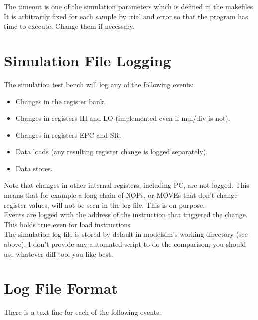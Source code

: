     The timeout is one of the simulation parameters which is defined in
    the makefiles. It is arbitrarily fixed for each sample by trial and error 
    so that the program has time to execute. Change them if necessary.\\
    
\section{Simulation File Logging}
\label{sim_logging}

    The simulation test bench will log any of the following events:

    \begin{itemize}
    \item Changes in the register bank.
    \item Changes in registers HI and LO (implemented even if mul/div is not).
    \item Changes in registers EPC and SR.
    \item Data loads (any resulting register change is logged separately).
    \item Data stores.
    \end{itemize}

    Note that changes in other internal registers, including PC, are not logged.
    This means that for example a long chain of NOPs, or MOVEs that don't change
    register values, will not be seen in the log file. This is on purpose.\\

    Events are logged with the address of the instruction that triggered 
    the change. This holds true even for load instructions.\\

    The simulation log file is stored by default in modelsim's working directory
    (see above). I don't provide any automated script to do the comparison, you
    should use whatever diff tool you like best.\\

\section{Log File Format}
\label{log_file_format}

    There is a text line for each of the following events:

